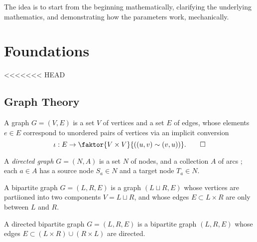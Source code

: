 \documentclass[twoside]{article} %
\theoremstyle{plain}
\theoremstyle{definition}
\begin{document}
%
%
    \onecolumn

    The idea is to start from the beginning mathematically, clarifying the underlying mathematics, and demonstrating how the parameters work, mechanically.
    
    \tableofcontents
    \twocolumn
    \clearpage
    
    \section{Foundations}
    
<<<<<<< HEAD
    \subsection{Graph Theory}
    \begin{defn}[Graph]
        A graph $G = (V,E)$ is a set $V$ of vertices
        and a set $E$ of edges,
        whose elements $e \in E$
        correspond to unordered pairs of vertices
        via an implicit conversion
        \[
            \iota: E \to \faktor{ V \times V }{ ((u,v)\sim(v,u)) }.
            \qedhere
        \]
    \end{defn}
    
    \begin{defn}
        A \emph{directed graph} $G = (N, A)$ is a set $N$ of nodes,
        and a collection $A$ of arcs ; each $a \in A$ has a 
        source node $S_a \in N$ and a target node $T_a \in N$.
    \end{defn}
    
    \begin{defn}
        A bipartite graph $G = (L, R, E)$ is a graph $(L \sqcup R, E)$ whose
        vertices are partiioned into two components $V = L \sqcup R$, 
        and whose edges $E \subset L \times R$ are only between $L$ and $R$. 
    \end{defn}
    
    \begin{defn}
        A directed bipartite graph $G = (L, R, E)$ is a bipartite graph $(L, R, E)$ whose
        edges $E \subset (L \times R) \cup (R \times L)$ are directed. 
    \end{defn}
    
\end{document}

